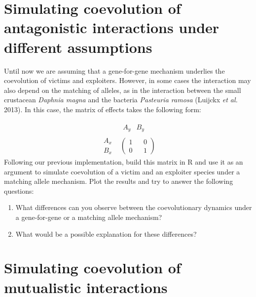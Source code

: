\documentclass[
]{book}
\begin{document}
\hypertarget{simulating-coevolution-of-antagonistic-interactions-under-different-assumptions}{%
\section{Simulating coevolution of antagonistic interactions under different assumptions}\label{simulating-coevolution-of-antagonistic-interactions-under-different-assumptions}}

Until now we are assuming that a gene-for-gene mechanism underlies the coevolution of victims and exploiters. However, in some cases the interaction may also depend on the matching of alleles, as in the interaction between the small crustacean \emph{Daphnia magna} and the bacteria \emph{Pasteuria ramosa} (Luijckx \emph{et al.} 2013). In this case, the matrix of effects takes the following form:

\[
\begin{array}{cc} &
\begin{array}{cc} A_{y} & B_{y} \end{array}
\\
\begin{array}{cc}
A_{x} \\
B_{x} \end{array}
&
\left(
\begin{array}{cc}
1 && 0 \\
0 && 1 \end{array}
\right)\end{array}
\]
Following our previous implementation, build this matrix in R and use it as an argument to simulate coevolution of a victim and an exploiter species under a matching allele mechanism. Plot the results and try to answer the following questions:

\begin{enumerate}
\def\labelenumi{\arabic{enumi}.}
\item
  What differences can you observe between the coevolutionary dynamics under a gene-for-gene or a matching allele mechanism?
\item
  What would be a possible explanation for these differences?
\end{enumerate}

\hypertarget{simulating-coevolution-of-mutualistic-interactions}{%
\section{Simulating coevolution of mutualistic interactions}\label{simulating-coevolution-of-mutualistic-interactions}}
\end{document}
